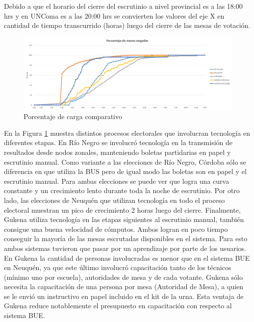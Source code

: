Debido a que el horario del cierre del escrutinio a nivel provincial es a las 18:00 hrs y en UNComa es a las 20:00 hrs se convierten los valores del eje X en cantidad de tiempo transcurrido (horas) luego del cierre de las mesas de votación. 

\begin{figure}[h!]
    \begin{center}
        \includegraphics[width=\textwidth]{img/PorcentajeComparativaTodas.png}
    \end{center}
  \caption{Porcentaje de carga comparativo}
  \label{graf:provincialConGukena}
\end{figure}
En la Figura \ref{graf:provincialConGukena} muestra distintos procesos electorales que involucran tecnología en diferentes etapas. En Río Negro se involucró tecnología en la transmisión de resultados desde nodos zonales, manteniendo boletas partidarias en papel y escrutinio manual. Como variante a las elecciones de Río Negro, Córdoba sólo se diferencia en que utiliza la BUS pero de igual modo las boletas son en papel y el escrutinio manual. Para ambas elecciones se puede ver que logra una curva constante y un crecimiento lento durante toda la noche de escrutinio. Por otro lado, las elecciones de Neuquén que utilizan tecnología en todo el proceso electoral muestran un pico de crecimiento 2 horas luego del cierre. Finalmente, Gukena utiliza tecnología en las etapas siguientes al escrutinio manual, también consigue una buena velocidad de cómputos. Ambos logran en poco tiempo conseguir la mayoría de las mesas escrutadas disponibles en el sistema. Para esto ambos sistemas tuvieron que pasar por un aprendizaje por parte de los usuarios. En Gukena la cantidad de personas involucradas es menor que en el sistema BUE en Neuquén, ya que este último involucró capacitación tanto de los técnicos (mínimo uno por escuela), autoridades de mesa y de cada votante. Gukena sólo necesita la capacitación de una persona por mesa (Autoridad de Mesa), a quien se le envió un instructivo en papel incluido en el kit de la urna. Esta ventaja de Gukena reduce notablemente el presupuesto en capacitación con respecto al sistema BUE.

